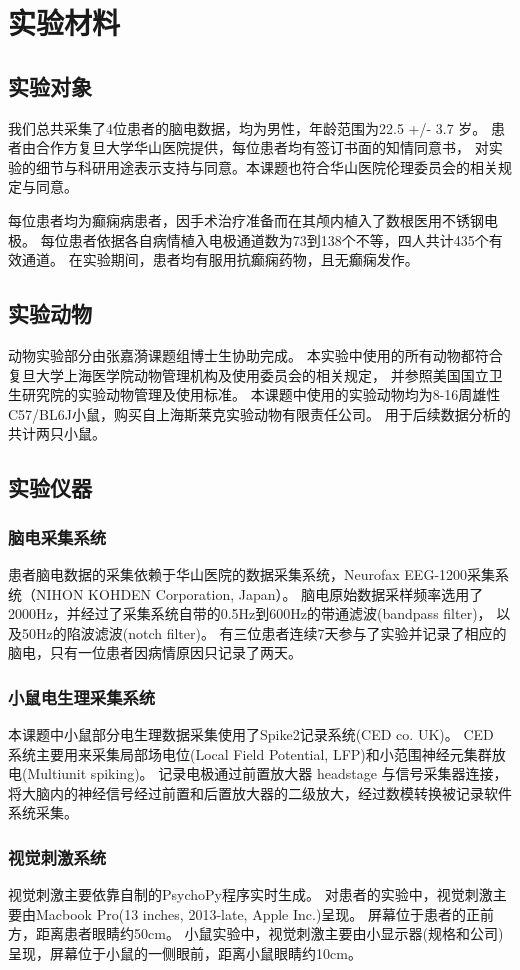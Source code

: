 \section{实验材料}

\subsection{实验对象}
我们总共采集了4位患者的脑电数据，均为男性，年龄范围为22.5 +/- 3.7 岁。
患者由合作方复旦大学华山医院提供，每位患者均有签订书面的知情同意书，
对实验的细节与科研用途表示支持与同意。本课题也符合华山医院伦理委员会的相关规定与同意。

每位患者均为癫痫病患者，因手术治疗准备而在其颅内植入了数根医用不锈钢电极。
每位患者依据各自病情植入电极通道数为73到138个不等，四人共计435个有效通道。
在实验期间，患者均有服用抗癫痫药物，且无癫痫发作。

\subsection{实验动物}
动物实验部分由张嘉漪课题组博士生协助完成。
本实验中使用的所有动物都符合复旦大学上海医学院动物管理机构及使用委员会的相关规定，
并参照美国国立卫生研究院的实验动物管理及使用标准。
本课题中使用的实验动物均为8-16周雄性C57/BL6J小鼠，购买自上海斯莱克实验动物有限责任公司。
用于后续数据分析的共计两只小鼠。

\subsection{实验仪器}

\subsubsection{脑电采集系统}
患者脑电数据的采集依赖于华山医院的数据采集系统，Neurofax EEG-1200采集系统（NIHON KOHDEN Corporation, Japan）。
脑电原始数据采样频率选用了2000Hz，并经过了采集系统自带的0.5Hz到600Hz的带通滤波(bandpass filter)，
以及50Hz的陷波滤波(notch filter)。
有三位患者连续7天参与了实验并记录了相应的脑电，只有一位患者因病情原因只记录了两天。

\subsubsection{小鼠电生理采集系统}
本课题中小鼠部分电生理数据采集使用了Spike2记录系统(CED co. UK)。
CED 系统主要用来采集局部场电位(Local Field Potential, LFP)和小范围神经元集群放电(Multiunit spiking)。
记录电极通过前置放大器 headstage 与信号采集器连接，
将大脑内的神经信号经过前置和后置放大器的二级放大，经过数模转换被记录软件系统采集。

\subsubsection{视觉刺激系统}
视觉刺激主要依靠自制的PsychoPy程序实时生成。%
对患者的实验中，视觉刺激主要由Macbook Pro(13 inches, 2013-late, Apple Inc.)呈现。
屏幕位于患者的正前方，距离患者眼睛约50cm。
小鼠实验中，视觉刺激主要由小显示器(规格和公司)呈现，屏幕位于小鼠的一侧眼前，距离小鼠眼睛约10cm。
